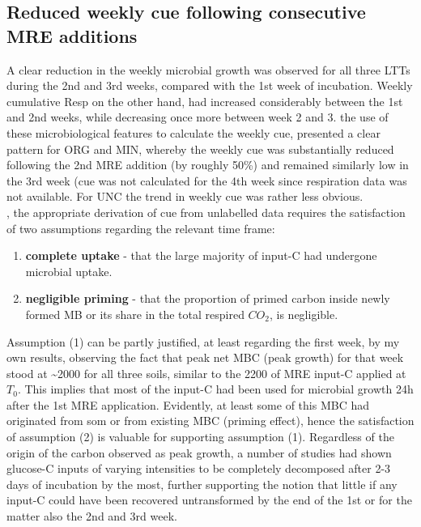 	\subsection{Reduced weekly \gls{cue} following consecutive MRE additions}

	A clear reduction in the weekly microbial growth was observed for all three LTTs during the 2nd and 3rd weeks, compared with the 1st week of incubation.
	Weekly cumulative Resp on the other hand, had increased considerably between the 1st and 2nd weeks, while decreasing once more between week 2 and 3.
	the use of these microbiological features to calculate the weekly \gls{cue}, presented a clear pattern for ORG and MIN, whereby the weekly \gls{cue} was substantially reduced following the 2nd MRE addition (by roughly 50\%) and remained similarly low in the 3rd week (\gls{cue} was not calculated for the 4th week since respiration data was not available. For UNC the trend in weekly \gls{cue} was rather less obvious.\\
	, the appropriate derivation of \gls{cue} from unlabelled data requires the satisfaction of two assumptions regarding the relevant time frame:
	\begin{enumerate}
		\item \label{item: complete_uptake}\textbf{complete uptake} - that the large majority of input-C had undergone microbial uptake.
		\item \label{item: negligible_priming}\textbf{negligible priming} - that the proportion of primed carbon inside newly formed MB or its share in the total respired $ CO_2 $, is negligible.
	\end{enumerate}
	Assumption (1) can be partly justified, at least regarding the first week, by  my own results,  observing the fact that peak net MBC (peak growth) for that week stood at \~{}2000 \genericunit for all three soils, similar to the 2200 \genericunit of MRE input-C applied at $ T_0 $. This implies that most of the  input-C had been used for microbial growth 24h after the 1st MRE application. Evidently, at least some of this MBC had originated from \gls{som} or from existing MBC (priming effect), hence the satisfaction of assumption (2) is valuable for supporting assumption (1). Regardless of the origin of the carbon observed as peak growth, a  number of studies had shown glucose-C inputs of varying intensities to be completely decomposed after 2-3 days of incubation by the most\citep{hill2008, landi2006}, further supporting the notion that little if any input-C could have been recovered untransformed by the end of the 1st or for the matter also the 2nd and 3rd week.
